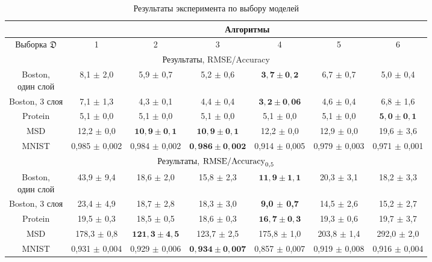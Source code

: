 \begin{table}[htbp!]
\captionsetup{justification=raggedright,singlelinecheck=false}
\centering
\label{table2}
\caption{Результаты эксперимента по выбору моделей}
\footnotesize
\begin{tabular}{ | c | c | c | c | c | c | c |}

\hline
&\multicolumn{6}{|c|}{Алгоритмы}  \\
\hline
Выборка $\mathfrak{D}$ & 1 & 2 & 3 & 4 & 5 & 6 \\
\hline
\multicolumn{7}{|c|}{Результаты, RMSE/Accuracy}  \\

\hline
\specialcell{ Boston,  \\один  слой} & 8,1  $\pm$ 2,0 & 5,9 $\pm$ 0,7 & 5,2 $\pm$ 0,6 & $\mathbf{3,7 \pm 0,2}$ & 6,7 $\pm$ 0,7 & 5,0 $\pm$ 0,4 \\
\hline
Boston, 3 слоя & 7,1 $\pm$ 1,3 & 4,3 $\pm$ 0,1 & 4,4 $\pm$ 0,4 & $\mathbf{3,2 \pm 0,06}$ & 4,6 $\pm$ 0,4 & 6,8 $\pm$ 1,6 \\
\hline
Protein & 5,1 $\pm$ 0,0 & 5,1 $\pm$ 0,0 & 5,1 $\pm$ 0,0 & 5,1 $\pm$ 0,0 & 5,1 $\pm$ 0,0 & $\mathbf{5,0 \pm 0,1}$ \\
\hline
MSD & 12,2 $\pm$ 0,0 & $\mathbf{10,9 \pm 0,1}$ & $\mathbf{10,9 \pm 0,1}$ & 12,2 $\pm$ 0,0 & 12,9 $\pm$ 0,0 & 19,6 $\pm$ 3,6  \\
\hline
MNIST & 0,985 $\pm$ 0,002 & 0,984 $\pm$ 0,002 & $\mathbf{0,986 \pm 0,002}$ & 0,914 $\pm$ 0,005 & 0,979 $\pm$ 0,003 & 0,971 $\pm$ 0,001 \\
\hline

\multicolumn{7}{|c|}{Результаты, $\textnormal{RMSE/Accuracy}_{0,5}$}  \\
\hline
\specialcell{ Boston,  \\один  слой} & 43,9  $\pm$ 9,4 & 18,6 $\pm$ 2,0 &  15,8 $\pm$ 2,3 & $\mathbf{11,9 \pm 1,1}$ & 20,3 $\pm$ 3,1 & 18,2 $\pm$ 3,3 \\
\hline
Boston, 3 слоя & 23,4 $\pm$ 4,9 & 18,7 $\pm$ 2,8 & 18,3 $\pm$ 3,0 & \bf 9,0 $\pm$ 0,7 & 14,5 $\pm$ 2,6 &  15,2 $\pm$ 2,7 \\
\hline
Protein & 19,5 $\pm$ 0,3 & 18,5 $\pm$ 0,5 & 18,6 $\pm$ 0,3 & $\mathbf{16,7 \pm 0,3}$ & 19,3 $\pm$ 0,6 & 19,7 $\pm$ 3,7  \\
\hline
MSD & 178,3 $\pm$ 0,8 & $\mathbf{121,3 \pm 4,5}$ & 123,7 $\pm$ 2,5 & 175,8 $\pm$ 1,0 & 203,8 $\pm$ 1,4 & 292,0 $\pm$ 2,0 \\
\hline
MNIST & 0,931 $\pm$ 0,004 & 0,929 $\pm$ 0,006 & $\mathbf{0,934 \pm 0,007}$ & 0,857 $\pm$ 0,007 & 0,919 $\pm$ 0,008 & 0,916 $\pm$ 0,004 \\
\hline



\end{tabular}
\end{table}
